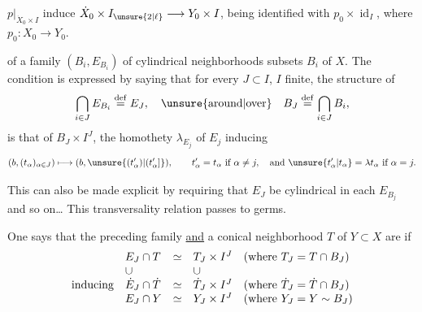 $p|_{\dot X_0\times I}$ induce $\dot X_0\times I_{\unsure{2|\ell}}\longrightarrow Y_0\times I$,
being identified with $p_0\times\operatorname{id}_I$, where $p_0:X_0\longrightarrow Y_0$.

 of a  family
$(B_i,E_{B_i})$ of cylindrical neighborhoods  subsets $B_i$ of $X$.
The condition is expressed by saying that for
every $J\subset I$, $I$ finite, the structure of
\[
\bigcap_{i\in J}E_{B_i}\overset{\mathrm{def}}=E_J,
\quad\text{\unsure{around|over}}\quad
B_J\overset{\mathrm{def}}=\bigcap_{i\in J}B_i,
\]
is that of $B_J\times I^J$, the homothety
$\lambda_{E_j}$ of $E_j$  inducing
\[
(b,(t_\alpha)_{\alpha\in J})\longmapsto(b,\unsure{(t'_\alpha)|(t'_\alpha]}),
\qquad
t'_\alpha=t_\alpha\ \text{if }\alpha\ne j,\quad
\text{and }\unsure{t'_\alpha|t_\alpha}=\lambda t_\alpha\ \text{if }\alpha=j.
\]

This can also be made explicit by requiring
that $E_J$ be cylindrical in each $E_{B_j}$ and so on\ldots
This transversality relation passes to germs.

One says that the preceding family \uline{and}
a conical neighborhood $T$ of $Y\subset X$ are
 
if 
\[
\begin{array}{l@{\quad}lcl@{\quad}l}
& E_J\cap T & \simeq & T_J\times I^J
& (\text{where }T_J=T\cap B_J)\\
&\cup&&\cup&\\
\text{inducing}&\dot E_J\cap\dot T&\simeq&\dot T_J\times I^J
&(\text{where }\dot T_J=\dot T\cap B_J)\\
&E_J\cap Y&\simeq&Y_J\times I^J
&(\text{where }Y_J=Y\sim B_J)
\end{array}
\]
